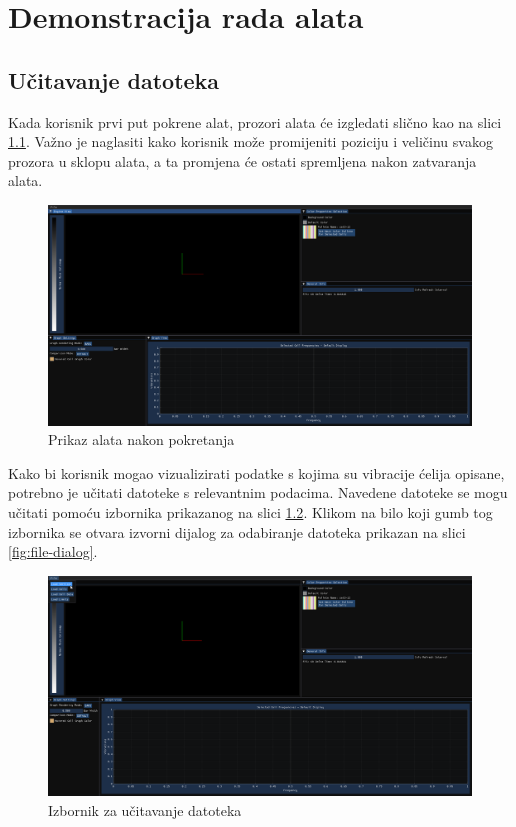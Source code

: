 \documentclass[times, utf8, diplomski]{fer}
\begin{document}
\chapter{Demonstracija rada alata}

\section{Učitavanje datoteka}

Kada korisnik prvi put pokrene alat, prozori alata će izgledati slično kao na slici \ref{fig:initial-screenshot}. Važno je naglasiti kako korisnik može promijeniti poziciju i veličinu svakog prozora u sklopu alata, a ta promjena će ostati spremljena nakon zatvaranja alata.

\begin{figure} [H]
	\centering
    \includegraphics[width=\textwidth]{demonstration/initial_screenshot.png}
    \caption{Prikaz alata nakon pokretanja}
    \label{fig:initial-screenshot}
\end{figure}

Kako bi korisnik mogao vizualizirati podatke s kojima su vibracije ćelija opisane, potrebno je učitati datoteke s relevantnim podacima. Navedene datoteke se mogu učitati pomoću izbornika prikazanog na slici \ref{fig:file-menu}. Klikom na bilo koji gumb tog izbornika se otvara izvorni dijalog za odabiranje datoteka prikazan na slici \ref{fig:file-dialog}.

\begin{figure} [H]
	\centering
    \includegraphics[width=\textwidth]{demonstration/load_file_menu.png}
    \caption{Izbornik za učitavanje datoteka}
    \label{fig:file-menu}
\end{figure}
\end{document}
